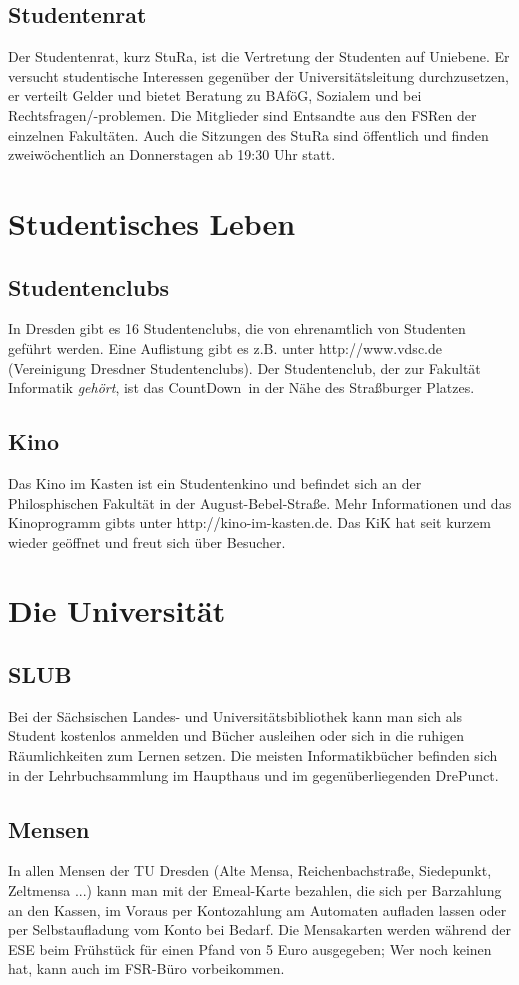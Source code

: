 \documentclass[a4paper,12pt]{report}
\begin{document}
\subsection{Studentenrat}
Der Studentenrat, kurz StuRa, ist die Vertretung der Studenten auf Uniebene.
Er versucht studentische Interessen gegenüber der Universitätsleitung durchzusetzen, er verteilt Gelder und bietet Beratung zu BAföG, Sozialem und bei Rechtsfragen/-problemen.
Die Mitglieder sind Entsandte aus den FSRen der einzelnen Fakultäten.
Auch die Sitzungen des StuRa sind öffentlich und finden zweiwöchentlich an Donnerstagen ab 19:30 Uhr statt.

\section{Studentisches Leben}
\subsection{Studentenclubs}
In Dresden gibt es 16 Studentenclubs, die von ehrenamtlich von Studenten geführt werden.
Eine Auflistung gibt es z.B. unter http://www.vdsc.de (Vereinigung Dresdner Studentenclubs).
Der Studentenclub, der zur Fakultät Informatik \textit{gehört}, ist das \glqq CountDown\grqq\ in der Nähe des Straßburger Platzes.
\subsection{Kino}
Das Kino im Kasten ist ein Studentenkino und befindet sich an der Philosphischen Fakultät in der August-Bebel-Straße.
Mehr Informationen und das Kinoprogramm gibts unter http://kino-im-kasten.de.
Das KiK hat seit kurzem wieder geöffnet und freut sich über Besucher.

\section{Die Universität}
\subsection{SLUB}
Bei der Sächsischen Landes- und Universitätsbibliothek kann man sich als Student kostenlos anmelden und Bücher ausleihen oder sich in die ruhigen Räumlichkeiten zum Lernen setzen.
Die meisten Informatikbücher befinden sich in der Lehrbuchsammlung im Haupthaus und im gegenüberliegenden \glqq DrePunct\grqq.
\subsection{Mensen}
In allen Mensen der TU Dresden (Alte Mensa, Reichenbachstraße, Siedepunkt, Zeltmensa ...) kann man mit der \glqq Emeal\grqq-Karte bezahlen, die sich per Barzahlung an den Kassen, im Voraus per Kontozahlung am Automaten aufladen lassen oder per Selbstaufladung vom Konto bei Bedarf.
Die Mensakarten werden während der ESE beim Frühstück für einen Pfand von 5 Euro ausgegeben;
Wer noch keinen hat, kann auch im FSR-Büro vorbeikommen.
\end{document}
